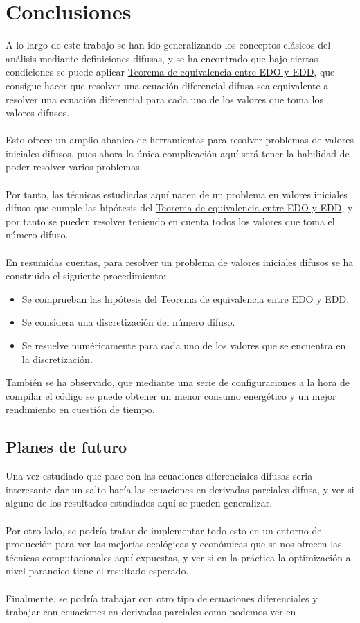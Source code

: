 \chapter{Conclusiones}
A lo largo de este trabajo se han ido generalizando los conceptos clásicos del análisis mediante definiciones difusas, y se ha encontrado que bajo ciertas condiciones se puede aplicar \hyperref[teorema:equivalencia]{Teorema de equivalencia entre EDO y EDD}, que consigue hacer que resolver una ecuación diferencial difusa sea equivalente a resolver una ecuación diferencial para cada uno de los valores que toma los valores difusos. 
\\ \\
Esto ofrece un amplio abanico de herramientas para resolver problemas de valores iniciales difusos, pues ahora la única complicación aquí será tener la habilidad de poder resolver varios problemas.
\\ \\
Por tanto, las técnicas estudiadas aquí nacen de un problema en valores iniciales difuso que cumple las hipótesis del \hyperref[teorema:equivalencia]{Teorema de equivalencia entre EDO y EDD}, y por tanto se pueden resolver teniendo en cuenta todos los valores que toma el número difuso.
\\ \\
En resumidas cuentas, para resolver un problema de valores iniciales difusos se ha construido el siguiente procedimiento:
\begin{itemize}
	\item Se comprueban las hipótesis del \hyperref[teorema:equivalencia]{Teorema de equivalencia entre EDO y EDD}.
	
	\item Se considera una discretización del número difuso.
	
	\item Se resuelve numéricamente para cada uno de los valores que se encuentra en la discretización.
\end{itemize}
También se ha observado, que mediante una serie de configuraciones a la hora de compilar el código se puede obtener un menor consumo energético y un mejor rendimiento en cuestión de tiempo.

\section{Planes de futuro}
Una vez estudiado que pase con las ecuaciones diferenciales difusas seria interesante dar un salto hacía las ecuaciones en derivadas parciales difusa, y ver si alguno de los resultados estudiados aquí se pueden generalizar.
\\ \\
Por otro lado, se podría tratar de implementar todo esto en un entorno de producción para ver las mejorías ecológicas y económicas que se nos ofrecen las técnicas computacionales aquí expuestas, y ver si en la práctica la optimización a nivel paranoico tiene el resultado esperado. \\ \\
Finalmente, se podría trabajar con otro tipo de ecuaciones diferenciales y trabajar con ecuaciones en derivadas parciales como podemos ver en \cite{difffuzzy2}